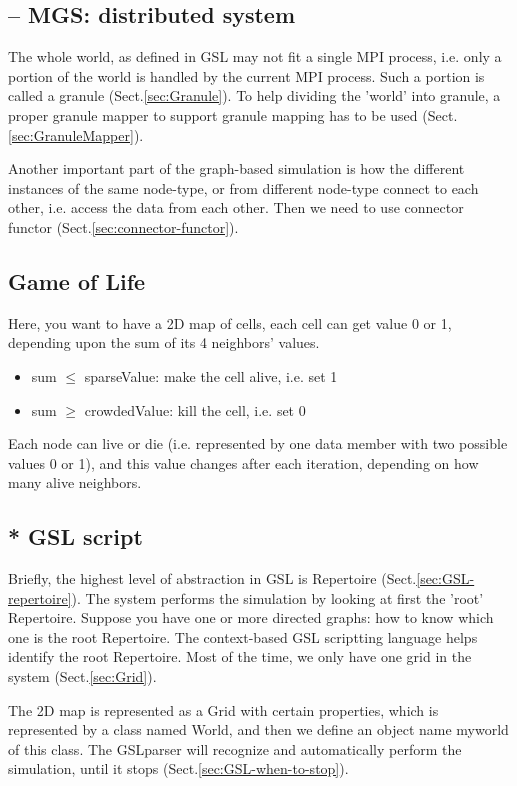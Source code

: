 \subsection{-- MGS: distributed system}
\label{sec:MGS-distributed-system}

The whole world, as defined in GSL may not fit a single MPI process, i.e. only a
portion of the world is handled by the current MPI process. Such a portion is
called a granule (Sect.\ref{sec:Granule}). To help dividing the 'world' into
granule, a proper granule mapper to support granule mapping has to be used
(Sect.\ref{sec:GranuleMapper}).

Another important part of the graph-based simulation is how the different
instances of the same node-type, or from different node-type connect to each
other, i.e. access the data from each other. Then we need to use connector
functor (Sect.\ref{sec:connector-functor}).


\subsection{Game of Life}
\label{sec:nts-example-game-of-life}

Here, you want to have a 2D map of cells, each cell can get value 0 or 1,
depending upon the sum of its 4 neighbors' values.
\begin{itemize}
  \item sum $\le$ sparseValue: make the cell alive, i.e. set 1
  \item sum $\ge$ crowdedValue: kill the cell, i.e. set 0
\end{itemize}
Each node can live or die (i.e. represented by one data member with two
possible values 0 or 1), and this value changes after each iteration, depending
on how many alive neighbors.

\subsection{* GSL script}

Briefly, the highest level of abstraction in GSL is Repertoire
(Sect.\ref{sec:GSL-repertoire}). The system performs the simulation by looking
at first the 'root' Repertoire.
Suppose you have one or more directed graphs: how to know which one is the root
Repertoire. The context-based GSL scriptting language helps identify the root
Repertoire. Most of the time, we only have one grid in the system
(Sect.\ref{sec:Grid}).

The 2D map is represented as a Grid with certain properties, which is
represented by a class named World, and then we define an object name myworld of
this class. The GSLparser will recognize and automatically perform the
simulation, until it stops (Sect.\ref{sec:GSL-when-to-stop}).

